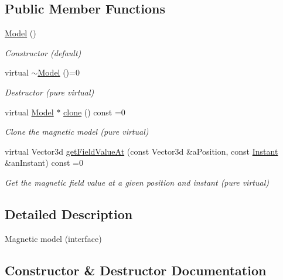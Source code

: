 \subsection*{Public Member Functions}
\begin{DoxyCompactItemize}
\item 
\hyperlink{classlibrary_1_1physics_1_1environment_1_1magnetic_1_1_model_a55a7ccfc0aa4d8cca9e142d3dcca8de2}{Model} ()
\begin{DoxyCompactList}\small\item\em Constructor (default) \end{DoxyCompactList}\item 
virtual \hyperlink{classlibrary_1_1physics_1_1environment_1_1magnetic_1_1_model_a6de43b7f99254e3c15832f65a8f47926}{$\sim$\+Model} ()=0
\begin{DoxyCompactList}\small\item\em Destructor (pure virtual) \end{DoxyCompactList}\item 
virtual \hyperlink{classlibrary_1_1physics_1_1environment_1_1magnetic_1_1_model}{Model} $\ast$ \hyperlink{classlibrary_1_1physics_1_1environment_1_1magnetic_1_1_model_a84e1a8fe50b33cab51821a9737dcead7}{clone} () const =0
\begin{DoxyCompactList}\small\item\em Clone the magnetic model (pure virtual) \end{DoxyCompactList}\item 
virtual Vector3d \hyperlink{classlibrary_1_1physics_1_1environment_1_1magnetic_1_1_model_aa15f7c2f01867c057481c2fabe645210}{get\+Field\+Value\+At} (const Vector3d \&a\+Position, const \hyperlink{classlibrary_1_1physics_1_1time_1_1_instant}{Instant} \&an\+Instant) const =0
\begin{DoxyCompactList}\small\item\em Get the magnetic field value at a given position and instant (pure virtual) \end{DoxyCompactList}\end{DoxyCompactItemize}


\subsection{Detailed Description}
Magnetic model (interface) 

\subsection{Constructor \& Destructor Documentation}
\mbox{\label{classlibrary_1_1physics_1_1environment_1_1magnetic_1_1_model_a55a7ccfc0aa4d8cca9e142d3dcca8de2}} 
